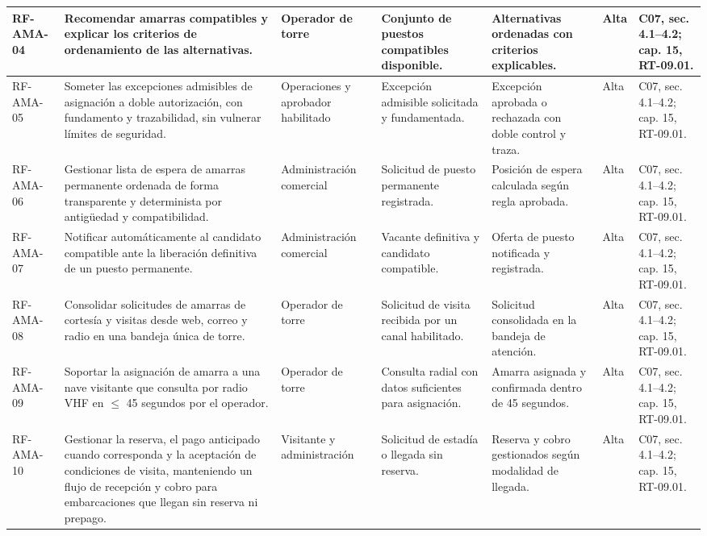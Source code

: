\begin{longtable}{|L{0.080645\AnchoTablaAnexo}|L{0.262097\AnchoTablaAnexo}|L{0.100806\AnchoTablaAnexo}|L{0.145161\AnchoTablaAnexo}|L{0.173387\AnchoTablaAnexo}|L{0.060484\AnchoTablaAnexo}|L{0.177420\AnchoTablaAnexo}|}
RF-\allowbreak{}AMA-\allowbreak{}04 &
Recomendar amarras compatibles y explicar los criterios de ordenamiento de las alternativas. &
Operador de torre &
Conjunto de puestos compatibles disponible. &
Alternativas ordenadas con criterios explicables. &
Alta &
C07, sec. 4.1–4.2; cap. 15, RT-09.01. \\ \hline

RF-\allowbreak{}AMA-\allowbreak{}05 &
Someter las excepciones admisibles de asignación a doble autorización, con fundamento y trazabilidad, sin vulnerar límites de seguridad. &
Operaciones y aprobador habilitado &
Excepción admisible solicitada y fundamentada. &
Excepción aprobada o rechazada con doble control y traza. &
Alta &
C07, sec. 4.1–4.2; cap. 15, RT-09.01. \\ \hline

RF-\allowbreak{}AMA-\allowbreak{}06 &
Gestionar lista de espera de amarras permanente ordenada de forma transparente y determinista por antigüedad y compatibilidad. &
Administración comercial &
Solicitud de puesto permanente registrada. &
Posición de espera calculada según regla aprobada. &
Alta &
C07, sec. 4.1–4.2; cap. 15, RT-09.01. \\ \hline

RF-\allowbreak{}AMA-\allowbreak{}07 &
Notificar automáticamente al candidato compatible ante la liberación definitiva de un puesto permanente. &
Administración comercial &
Vacante definitiva y candidato compatible. &
Oferta de puesto notificada y registrada. &
Alta &
C07, sec. 4.1–4.2; cap. 15, RT-09.01. \\ \hline

RF-\allowbreak{}AMA-\allowbreak{}08 &
Consolidar solicitudes de amarras de cortesía y visitas desde web, correo y radio en una bandeja única de torre. &
Operador de torre &
Solicitud de visita recibida por un canal habilitado. &
Solicitud consolidada en la bandeja de atención. &
Alta &
C07, sec. 4.1–4.2; cap. 15, RT-09.01. \\ \hline

RF-\allowbreak{}AMA-\allowbreak{}09 &
Soportar la asignación de amarra a una nave visitante que consulta por radio VHF en \(\leq\) 45 segundos por el operador. &
Operador de torre &
Consulta radial con datos suficientes para asignación. &
Amarra asignada y confirmada dentro de 45 segundos. &
Alta &
C07, sec. 4.1–4.2; cap. 15, RT-09.01. \\ \hline

RF-\allowbreak{}AMA-\allowbreak{}10 &
Gestionar la reserva, el pago anticipado cuando corresponda y la aceptación de condiciones de visita, manteniendo un flujo de recepción y cobro para embarcaciones que llegan sin reserva ni prepago. &
Visitante y administración &
Solicitud de estadía o llegada sin reserva. &
Reserva y cobro gestionados según modalidad de llegada. &
Alta &
C07, sec. 4.1–4.2; cap. 15, RT-09.01. \\ \hline


\end{longtable}
